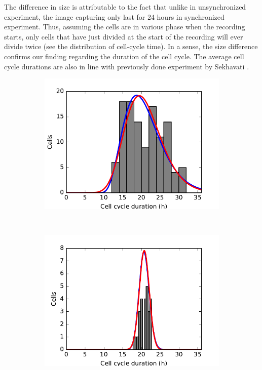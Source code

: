 \documentclass[pdftex,12pt,a4paper]{report}
\begin{document}
The difference in size is attributable to the fact that unlike in unsynchronized experiment, the image capturing only last for 24 hours in synchronized experiment. Thus, assuming the cells are in various phase when the recording starts, only cells that have just divided at the start of the recording will ever divide twice (see the distribution of cell-cycle time). In a sense, the size difference confirms our finding regarding the duration of the cell cycle. The average cell cycle durations are also in line with previously done experiment by Sekhavati \cite{sekhavati2015dynamic}.

\begin{figure}[H]
\centering
\begin{subfigure}{.48\textwidth}
  \centering
  \includegraphics[width=\textwidth]{images/unsyn_cell_cycle_length_control.pdf}
  \caption{}
  \label{fig:ccd_unsyn}
\end{subfigure}
~
\begin{subfigure}{.48\textwidth}
  \centering
  \includegraphics[width=\textwidth]{images/syn_cell_cycle_length_control.pdf}

\end{subfigure}
\end{figure}
\end{document}
